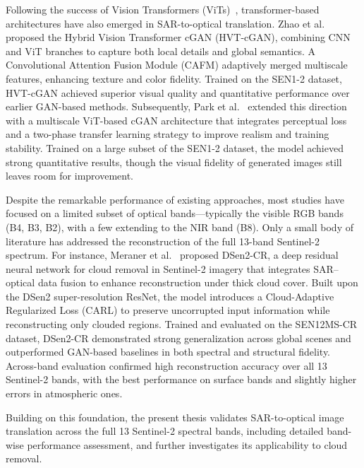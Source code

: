 Following the success of Vision Transformers (ViTs)~\cite{ViT_2020}, transformer-based architectures have also emerged in SAR-to-optical translation. Zhao et al.~\cite{hvt_cgan} proposed the Hybrid Vision Transformer cGAN (HVT-cGAN), combining CNN and ViT branches to capture both local details and global semantics. A Convolutional Attention Fusion Module (CAFM) adaptively merged multiscale features, enhancing texture and color fidelity. Trained on the SEN1-2 dataset, HVT-cGAN achieved superior visual quality and quantitative performance over earlier GAN-based methods. Subsequently, Park et al.~\cite{s2o_ViT_cGAN} extended this direction with a multiscale ViT-based cGAN architecture that integrates perceptual loss and a two-phase transfer learning strategy to improve realism and training stability. Trained on a large subset of the SEN1-2 dataset, the model achieved strong quantitative results, though the visual fidelity of generated images still leaves room for improvement.

Despite the remarkable performance of existing approaches, most studies have focused on a limited subset of optical bands—typically the visible RGB bands (B4, B3, B2), with a few extending to the NIR band (B8). Only a small body of literature has addressed the reconstruction of the full 13-band Sentinel-2 spectrum. For instance, Meraner et al.~\cite{CR_SEN2_dRNN} proposed DSen2-CR, a deep residual neural network for cloud removal in Sentinel-2 imagery that integrates SAR–optical data fusion to enhance reconstruction under thick cloud cover. Built upon the DSen2 super-resolution ResNet, the model introduces a Cloud-Adaptive Regularized Loss (CARL) to preserve uncorrupted input information while reconstructing only clouded regions. Trained and evaluated on the SEN12MS-CR dataset, DSen2-CR demonstrated strong generalization across global scenes and outperformed GAN-based baselines in both spectral and structural fidelity. Across-band evaluation confirmed high reconstruction accuracy over all 13 Sentinel-2 bands, with the best performance on surface bands and slightly higher errors in atmospheric ones.

Building on this foundation, the present thesis validates SAR-to-optical image translation across the full 13 Sentinel-2 spectral bands, including detailed band-wise performance assessment, and further investigates its applicability to cloud removal.
